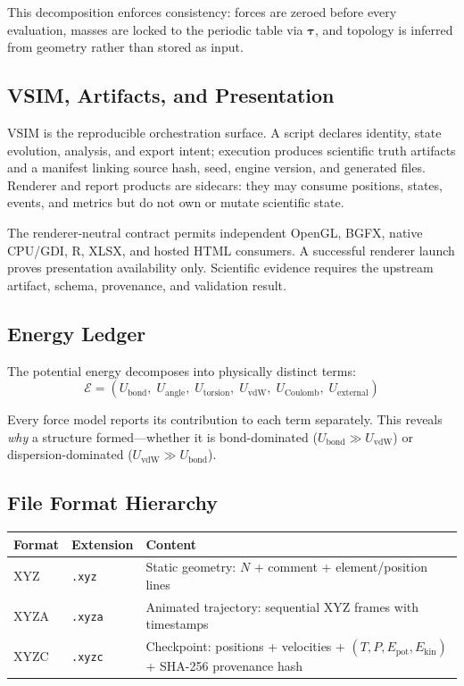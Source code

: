 \documentclass[11pt, a4paper]{article}
\begin{document}
This decomposition enforces consistency: forces are zeroed before every evaluation, masses are locked to the periodic table via $\boldsymbol{\tau}$, and topology is inferred from geometry rather than stored as input.

\subsection{VSIM, Artifacts, and Presentation}

VSIM is the reproducible orchestration surface. A script declares identity, state evolution, analysis, and export intent; execution produces scientific truth artifacts and a manifest linking source hash, seed, engine version, and generated files. Renderer and report products are sidecars: they may consume positions, states, events, and metrics but do not own or mutate scientific state.

The renderer-neutral contract permits independent OpenGL, BGFX, native CPU/GDI, R, XLSX, and hosted HTML consumers. A successful renderer launch proves presentation availability only. Scientific evidence requires the upstream artifact, schema, provenance, and validation result.

\subsection{Energy Ledger}

The potential energy decomposes into physically distinct terms:
\begin{equation}
\mathcal{E} = (U_\text{bond},\; U_\text{angle},\; U_\text{torsion},\; U_\text{vdW},\; U_\text{Coulomb},\; U_\text{external})
\end{equation}

Every force model reports its contribution to each term separately.  This reveals \emph{why} a structure formed---whether it is bond-dominated ($U_\text{bond} \gg U_\text{vdW}$) or dispersion-dominated ($U_\text{vdW} \gg U_\text{bond}$).

\subsection{File Format Hierarchy}

\begin{center}
\begin{tabular}{llp{7cm}}
\toprule
Format & Extension & Content \\
\midrule
XYZ & \texttt{.xyz} & Static geometry: $N$ + comment + element/position lines \\
XYZA & \texttt{.xyza} & Animated trajectory: sequential XYZ frames with timestamps \\
XYZC & \texttt{.xyzc} & Checkpoint: positions + velocities + $(T, P, E_\text{pot}, E_\text{kin})$ + SHA-256 provenance hash \\
\bottomrule
\end{tabular}
\end{center}
\end{document}
